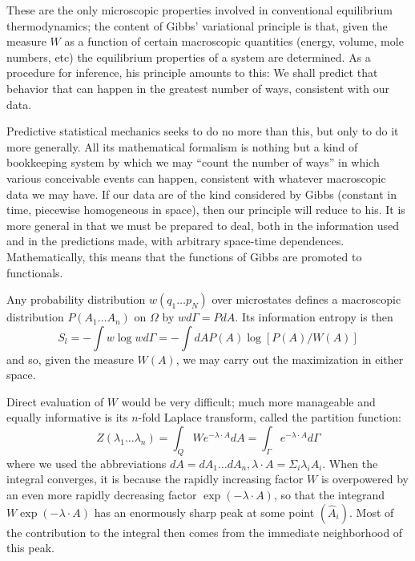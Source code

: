\documentclass{article}
\begin{document}
These are the only microscopic properties involved in conventional equilibrium thermodynamics; the content of Gibbs' variational principle is that, given the measure $W$ as a function of certain macroscopic quantities (energy, volume, mole numbers, etc) the equilibrium properties of a system are determined. As a procedure for inference, his principle amounts to this: We shall predict that behavior that can happen in the greatest number of ways, consistent with our data.

Predictive statistical mechanics seeks to do no more than this, but only to do it more generally. All its mathematical formalism is nothing but a kind of bookkeeping system by which we may ``count the number of ways'' in which various conceivable events can happen, consistent with whatever macroscopic data we may have. If our data are of the kind considered by Gibbs (constant in time, piecewise homogeneous in space), then our principle will reduce to his. It is more general in that we must be prepared to deal, both in the information used and in the predictions made, with arbitrary space-time dependences. Mathematically, this means that the functions of Gibbs are promoted to functionals.

Any probability distribution $w\left(q_1 \ldots p_N\right)$ over microstates defines a macroscopic distribution $P\left(A_1 \ldots A_n\right)$ on $\Omega$ by $w d \Gamma=P d A$. Its information entropy is then
\begin{equation}
S_l=-\int w \log w d \Gamma=-\int d A P(A) \log [P(A) / W(A)]
\end{equation}
and so, given the measure $W(A)$, we may carry out the maximization in either space.

Direct evaluation of $W$ would be very difficult; much more manageable and equally informative is its $n$-fold Laplace transform, called the partition function:
\begin{equation}
Z\left(\lambda_1 \ldots \lambda_n\right)=\int_Q W e^{-\lambda \cdot A} d A=\int_{\Gamma} e^{-\lambda \cdot A} d \Gamma
\end{equation}
where we used the abbreviations $d A=d A_1 \ldots d A_n, \lambda \cdot A=\Sigma_i \lambda_i A_i$. When the integral converges, it is because the rapidly increasing factor $W$ is overpowered by an even more rapidly decreasing factor $\exp (-\lambda \cdot A)$, so that the integrand $W \exp (-\lambda \cdot A)$ has an enormously sharp peak at some point $\left(\hat{A}_i\right)$. Most of the contribution to the integral then comes from the immediate neighborhood of this peak.
\end{document}
